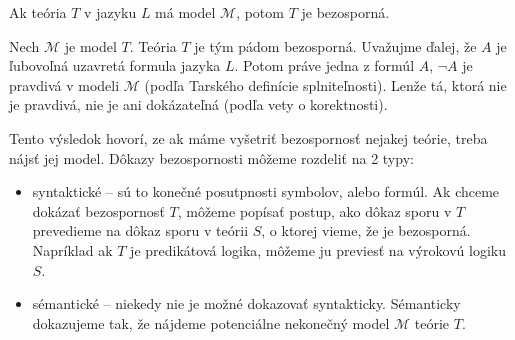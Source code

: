 \begin{dosledok}
    Ak teória $T$ v jazyku $L$ má model $\mathcal{M}$, potom $T$ je
    bezosporná.
\end{dosledok}
\begin{dokaz}
    Nech $\mathcal{M}$ je model $T$. Teória $T$ je tým pádom
    bezosporná. Uvažujme ďalej, že $A$ je ľubovoľná uzavretá formula jazyka $L$.
    Potom práve jedna z formúl $A$, $\neg A$ je pravdivá v modeli
    $\mathcal{M}$
    (podľa Tarského definície splniteľnosti).
    Lenže tá, ktorá nie je pravdivá, nie je ani dokázateľná 
    (podľa vety o korektnosti).
    \\
\end{dokaz}

\medskip
Tento výsledok hovorí, ze ak máme vyšetriť bezospornosť nejakej teórie,
treba nájsť jej model. Dôkazy bezospornosti môžeme rozdeliť na 2 typy:
\begin{itemize}
    \item syntaktické -- sú to konečné posutpnosti symbolov, alebo
        formúl. Ak chceme dokázať bezospornosť $T$, môžeme popísať
        postup, ako dôkaz sporu v $T$ prevedieme na dôkaz sporu
        v teórii $S$, o ktorej vieme, že je bezosporná.
        Napríklad ak $T$ je predikátová logika, môžeme ju previesť na
        výrokovú logiku $S$.

    \item sémantické -- niekedy nie je možné dokazovať syntakticky.
        Sémanticky dokazujeme tak, že nájdeme potenciálne nekonečný model
        $\mathcal{M}$ teórie $T$.
\end{itemize}


